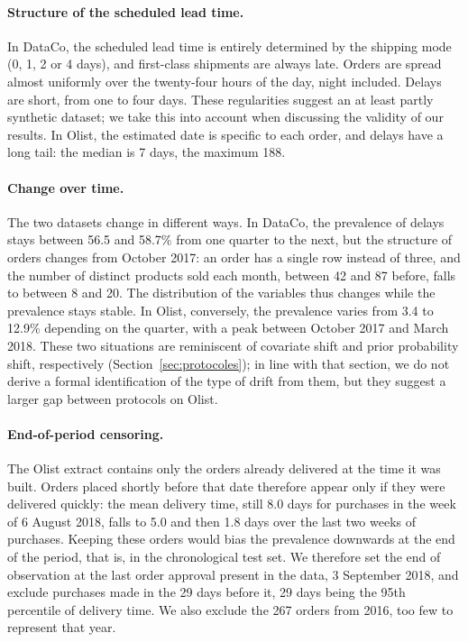 \documentclass[11pt,a4paper]{article}
\theoremstyle{definition}
\begin{document}
\paragraph{Structure of the scheduled lead time.} In DataCo, the scheduled lead time is entirely determined by the shipping mode (0, 1, 2 or 4 days), and first-class shipments are always late. Orders are spread almost uniformly over the twenty-four hours of the day, night included. Delays are short, from one to four days. These regularities suggest an at least partly synthetic dataset; we take this into account when discussing the validity of our results. In Olist, the estimated date is specific to each order, and delays have a long tail: the median is 7 days, the maximum 188.

\paragraph{Change over time.} The two datasets change in different ways. In DataCo, the prevalence of delays stays between 56.5 and 58.7\% from one quarter to the next, but the structure of orders changes from October 2017: an order has a single row instead of three, and the number of distinct products sold each month, between 42 and 87 before, falls to between 8 and 20. The distribution of the variables thus changes while the prevalence stays stable. In Olist, conversely, the prevalence varies from 3.4 to 12.9\% depending on the quarter, with a peak between October 2017 and March 2018. These two situations are reminiscent of covariate shift and prior probability shift, respectively (Section~\ref{sec:protocoles}); in line with that section, we do not derive a formal identification of the type of drift from them, but they suggest a larger gap between protocols on Olist.

\paragraph{End-of-period censoring.} The Olist extract contains only the orders already delivered at the time it was built. Orders placed shortly before that date therefore appear only if they were delivered quickly: the mean delivery time, still 8.0 days for purchases in the week of 6 August 2018, falls to 5.0 and then 1.8 days over the last two weeks of purchases. Keeping these orders would bias the prevalence downwards at the end of the period, that is, in the chronological test set. We therefore set the end of observation at the last order approval present in the data, 3 September 2018, and exclude purchases made in the 29 days before it, 29 days being the 95th percentile of delivery time. We also exclude the 267 orders from 2016, too few to represent that year.
\end{document}
